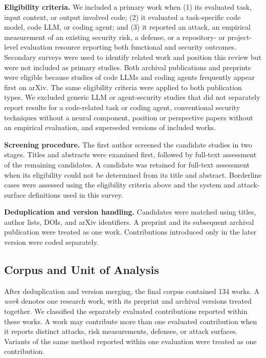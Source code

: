 \documentclass[acmsmall,screen,review]{acmart}
\begin{document}
\noindent\textbf{Eligibility criteria.}
We included a primary work when (1) its evaluated task, input context, or output involved code; (2) it evaluated a task-specific code model, code LLM, or coding agent; and (3) it reported an attack, an empirical measurement of an existing security risk, a defense, or a repository- or project-level evaluation resource reporting both functional and security outcomes. Secondary surveys were used to identify related work and position this review but were not included as primary studies.
Both archival publications and preprints were eligible because studies of code LLMs and coding agents frequently appear first on arXiv. The same eligibility criteria were applied to both publication types. We excluded generic LLM or agent-security studies that did not separately report results for a code-related task or coding agent, conventional security techniques without a neural component, position or perspective papers without an empirical evaluation, and superseded versions of included works.

\noindent\textbf{Screening procedure.}
The first author screened the candidate studies in two stages. Titles and abstracts were examined first, followed by full-text assessment of the remaining candidates. A candidate was retained for full-text assessment when its eligibility could not be determined from its title and abstract. Borderline cases were assessed using the eligibility criteria above and the system and attack-surface definitions used in this survey.

\noindent\textbf{Deduplication and version handling.}
Candidates were matched using titles, author lists, DOIs, and arXiv identifiers. A preprint and its subsequent archival publication were treated as one work. Contributions introduced only in the later version were coded separately.

\subsection{Corpus and Unit of Analysis}
\label{sec:corpus}

After deduplication and version merging, the final corpus contained 134 works. A \emph{work} denotes one research work, with its preprint and archival versions treated together. We classified the separately evaluated contributions reported within these works. A work may contribute more than one evaluated contribution when it reports distinct attacks, risk measurements, defenses, or attack surfaces. Variants of the same method reported within one evaluation were treated as one contribution.
\end{document}
